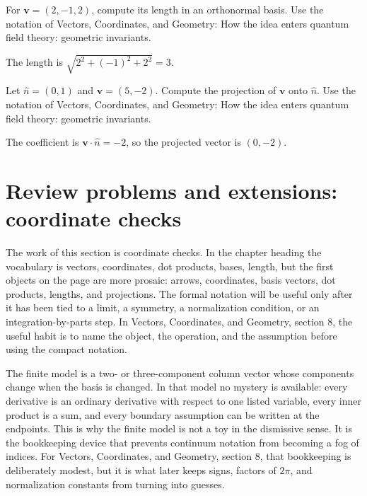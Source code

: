 \begin{exercise}
For \(\bm v=(2,-1,2)\), compute its length in an orthonormal basis.  Use the notation of Vectors, Coordinates, and Geometry: How the idea enters quantum field theory: geometric invariants.
\begin{answer}
The length is \(\sqrt{2^2+(-1)^2+2^2}=3\).
\end{answer}
\end{exercise}

\begin{exercise}
Let \(\hat n=(0,1)\) and \(\bm v=(5,-2)\).  Compute the projection of \(\bm v\) onto \(\hat n\).  Use the notation of Vectors, Coordinates, and Geometry: How the idea enters quantum field theory: geometric invariants.
\begin{answer}
The coefficient is \(\bm v\cdot\hat n=-2\), so the projected vector is \((0,-2)\).
\end{answer}
\end{exercise}



\section{Review problems and extensions: coordinate checks}

The work of this section is coordinate checks.  In the chapter heading the vocabulary is vectors, coordinates, dot products, bases, length, but the first objects on the page are more prosaic: arrows, coordinates, basis vectors, dot products, lengths, and projections.  The formal notation will be useful only after it has been tied to a limit, a symmetry, a normalization condition, or an integration-by-parts step.  In Vectors, Coordinates, and Geometry, section 8, the useful habit is to name the object, the operation, and the assumption before using the compact notation.

The finite model is a two- or three-component column vector whose components change when the basis is changed.  In that model no mystery is available: every derivative is an ordinary derivative with respect to one listed variable, every inner product is a sum, and every boundary assumption can be written at the endpoints.  This is why the finite model is not a toy in the dismissive sense.  It is the bookkeeping device that prevents continuum notation from becoming a fog of indices.  For Vectors, Coordinates, and Geometry, section 8, that bookkeeping is deliberately modest, but it is what later keeps signs, factors of \(2\pi\), and normalization constants from turning into guesses.

